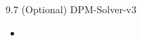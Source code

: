\begin{frame}{9.7 (Optional) DPM-Solver-v3}
    \begin{itemize}
        \item
    \end{itemize}
\end{frame}
